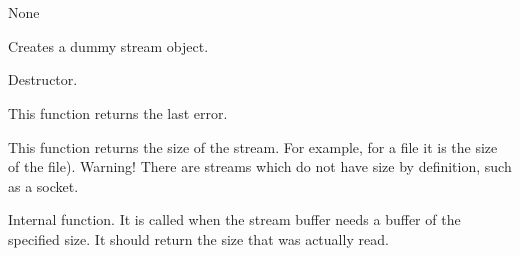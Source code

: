 \section{}\label{wxstreambase}


None







Creates a dummy stream object.



Destructor.

\label{wxstreambaselasterror}


This function returns the last error.


This function returns the size of the stream. For example, for a file it is the size of
the file). Warning! There are streams which do not have size by definition, such as a socket.

\label{wxstreambaseonsysread}


Internal function. It is called when the stream buffer needs a buffer of the
specified size. It should return the size that was actually read.


